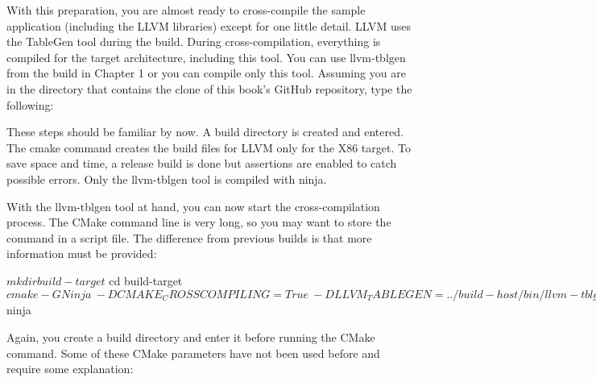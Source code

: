 With this preparation, you are almost ready to cross-compile the sample application (including the LLVM libraries) except for one little detail. LLVM uses the TableGen tool during the build. During cross-compilation, everything is compiled for the target architecture, including this tool. You can use llvm-tblgen from the build in Chapter 1 or you can compile only this tool. Assuming you are in the directory that contains the clone of this book’s GitHub repository, type the following:


These steps should be familiar by now. A build directory is created and entered. The cmake command creates the build files for LLVM only for the X86 target. To save space and time, a release build is done but assertions are enabled to catch possible errors. Only the llvm-tblgen tool is compiled with ninja.

With the llvm-tblgen tool at hand, you can now start the cross-compilation process. The CMake command line is very long, so you may want to store the command in a script file. The difference from previous builds is that more information must be provided:

\begin{shell}
$ mkdir build-target
$ cd build-target
$ cmake -G Ninja \
    -DCMAKE_CROSSCOMPILING=True \
    -DLLVM_TABLEGEN=../build-host/bin/llvm-tblgen \
    -DLLVM_DEFAULT_TARGET_TRIPLE=aarch64-linux-gnu \
    -DLLVM_TARGET_ARCH=AArch64 \
    -DLLVM_TARGETS_TO_BUILD=AArch64 \
    -DLLVM_ENABLE_ASSERTIONS=ON \
    -DLLVM_EXTERNAL_PROJECTS=tinylang \
    -DLLVM_EXTERNAL_TINYLANG_SOURCE_DIR=../tinylang \
    -DCMAKE_INSTALL_PREFIX=../target-tinylang \
    -DCMAKE_BUILD_TYPE=Release \
    -DCMAKE_C_COMPILER=aarch64-linux-gnu-gcc-12 \
    -DCMAKE_CXX_COMPILER=aarch64-linux-gnu-g++-12 \
    ../llvm-project/llvm
$ ninja
\end{shell}

Again, you create a build directory and enter it before running the CMake command. Some of these CMake parameters have not been used before and require some explanation:

